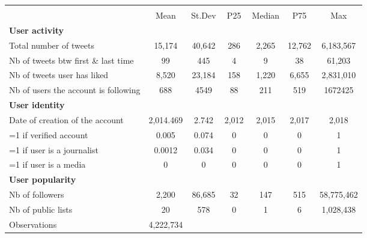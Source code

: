 {
\def\sym#1{\ifmmode^{#1}\else\(^{#1}\)\fi}
\begin{tabular}{l*{1}{cccccc}}
\hline\hline
                    &\multicolumn{6}{c}{}                                                         \\
                    &        Mean&      St.Dev&         P25&      Median&         P75&         Max\\
\hline
\textbf{User activity}&            &            &            &            &            &            \\
Total number of tweets&      15,174&      40,642&         286&       2,265&      12,762&   6,183,567\\
Nb of tweets btw first \& last time&          99&         445&           4&           9&          38&      61,203\\
Nb of tweets user has liked&       8,520&      23,184&         158&       1,220&       6,655&   2,831,010\\
Nb of users the account is following&         688&        4549&          88&         211&         519&     1672425\\
\textbf{User identity}&            &            &            &            &            &            \\
Date of creation of the account&   2,014.469&       2.742&       2,012&       2,015&       2,017&       2,018\\
=1 if verified account&       0.005&       0.074&           0&           0&           0&           1\\
=1 if user is a journalist&      0.0012&       0.034&           0&           0&           0&           1\\
=1 if user is a media&           0&           0&           0&           0&           0&           1\\
\textbf{User popularity}&            &            &            &            &            &            \\
Nb of followers     &       2,200&      86,685&          32&         147&         515&  58,775,462\\
Nb of public lists  &          20&         578&           0&           1&           6&   1,028,438\\
\hline
Observations        &   4,222,734&            &            &            &            &            \\
\hline\hline
\end{tabular}
}
